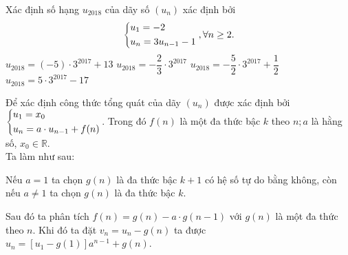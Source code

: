 \begin{vd}%
	Xác định số hạng $u_{2018}$ của dãy số $(u_n)$ xác định bởi $$\left\{\begin{aligned}&u_1=-2\\
		&u_n=3u_{n-1}-1\end{aligned}\right.,\forall n\ge 2.$$
	\choice
	{$u_{2018}=(-5)\cdot 3^{2017}+13$}
	{$u_{2018}=-\dfrac{2}{3}\cdot 3^{2017}$}
	{\True $u_{2018}=-\dfrac{5}{2}\cdot 3^{2017}+\dfrac{1}{2}$}
	{$u_{2018}=5\cdot 3^{2017}-17$}
\end{vd}
\begin{dang}{}
	Để xác định công thức tổng quát của dãy $(u_n)$ được xác định bởi $\left\{\begin{aligned}&u_1=x_0\\ &u_n=a\cdot u_{n-1}+f(n)\end{aligned}\right.$.  Trong đó $f(n)$ là một đa thức bậc $k$ theo $n;a$ là hằng số, $x_0\in \mathbb{R}$. \\
	Ta làm như sau:
	
	Nếu $a=1$ ta chọn $g(n)$ là đa thức bậc $k+1$ có hệ số tự do bằng không, còn nếu $a\ne 1$ ta chọn $g(n)$ là đa thức bậc $k$.
	
	Sau đó ta phân tích $f(n)=g(n)-a\cdot g(n-1)$ với $g(n)$ là một đa thức theo $n$. Khi đó ta đặt $v_n=u_n-g(n)$ ta được $u_n=\left[u_1-g(1)\right]a^{n-1}+g(n)$.
\end{dang}
